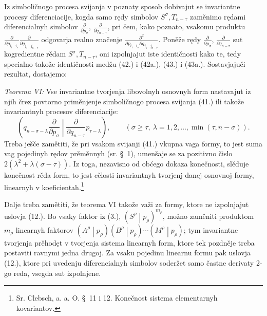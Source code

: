 \documentclass[11pt]{article}
\newcommand{\pair}[2]{\left(#1\middle|#2\right)}
\begin{document}
Iz simboličnogo procesa svijanja v poznaty sposob dobivajut se invariantne procesy diferenciacije, kogda samo rędy simbolov $S^\sigma,T_{n-\tau}$ zaměnimo rędami diferencialnyh simbolov $\frac{\partial}{\partial p_\sigma}$, $\frac{\partial}{\partial q_{n-\tau}}$, pri čem, kako poznato, vsakomu produktu $\frac{\partial}{\partial p_{i_1\ldots i_\sigma}}\frac{\partial}{\partial q_{j_1\ldots j_{n-\tau}}}$ odgovarja realno značenje $\frac{\partial^2}{\partial p_{i_1\ldots i_\sigma}\partial q_{j_1\ldots j_{n-\tau}}}$. Poněže rędy $\frac{\partial}{\partial p_\sigma}$, $\frac{\partial}{\partial q_{n-\tau}}$ sut kogredientne rědam $S^\sigma,T_{n-\tau}$, oni izpolnjajut iste identičnosti kako te, tedy specialno takože identičnosti medžu (42.) i (42a.), (43.) i (43a.). Sostavjajuči rezultat, dostajemo:

\emph{Teorema VI:} Vse invariantne tvorjenja libovolnyh osnovnyh form nastavajut iz njih črez povtorno priměnjenje simboličnogo procesa svijanja (41.) ili takože invariantnyh procesov diferenciacije:
\begin{equation}
 \left(q_{n-\sigma-\lambda}\frac{\partial}{\partial p_\sigma}
 \middle|\frac{\partial}{\partial q_{n-\tau}}p_{\tau-\lambda}\right),
 \qquad(\sigma\ge\tau,\ \lambda=1,2,\ldots,\min(\tau,n-\sigma)).
\tag{45}
\end{equation}
Treba ješče zamětiti, že pri vsakom svijanji (41.) vkupna vaga formy, to jest suma vag pojedinyh rędov prěměnnyh (sr. \S\ 1), umenšaje se za pozitivno čislo $2(\lambda^2+\lambda(\sigma-\tau))$. Iz toga, nezavisno od obćego dokaza konečnosti, slěduje konečnost rěda form, to jest cělosti invariantnyh tvorjenj danej osnovnoj formy, linearnyh v koeficientah.\footnote{Sr. Clebsch, a. a. O. \S\ 11 i 12. Konečnost sistema elementarnyh kovariantov.}

Dalje treba zamětiti, že teorema VI takože važi za formy, ktore ne izpolnjajut uslovja (12.). Bo vsaky faktor iz (3.), $\pair{S^\rho}{p_\rho}^{m_\rho}$, možno zaměniti produktom $m_\rho$ linearnyh faktorov $\pair{A^\rho}{p_\rho}\pair{B^\rho}{p_\rho}\cdots\pair{M^\rho}{p_\rho}$; tym invariantne tvorjenja prěhodęt v tvorjenja sistema linearnyh form, ktore tek pozdněje treba postaviti ravnymi jedna drugoj. Za vsaku pojedinu linearnu formu pak uslovja (12.), ktore pri uvedenju diferencialnyh simbolov soderžet samo častne derivaty 2-go reda, vsegda sut izpolnjene.
\end{document}
